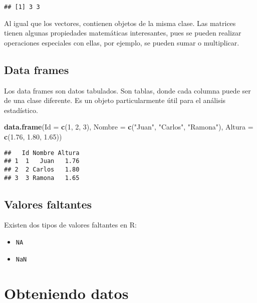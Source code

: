 \documentclass[spanish,]{book}
\newenvironment{Shaded}{\begin{snugshade}}{\end{snugshade}}
\newcommand{\KeywordTok}[1]{\textcolor[rgb]{0.13,0.29,0.53}{\textbf{#1}}}
\newcommand{\DataTypeTok}[1]{\textcolor[rgb]{0.13,0.29,0.53}{#1}}
\newcommand{\DecValTok}[1]{\textcolor[rgb]{0.00,0.00,0.81}{#1}}
\newcommand{\FloatTok}[1]{\textcolor[rgb]{0.00,0.00,0.81}{#1}}
\newcommand{\StringTok}[1]{\textcolor[rgb]{0.31,0.60,0.02}{#1}}
\newcommand{\NormalTok}[1]{#1}
\providecommand{\tightlist}{%
  \setlength{\itemsep}{0pt}\setlength{\parskip}{0pt}}
\begin{document}
\begin{verbatim}
## [1] 3 3
\end{verbatim}

Al igual que los vectores, contienen objetos de la misma clase. Las
matrices tienen algunas propiedades matemáticas interesantes, pues se
pueden realizar operaciones especiales con ellas, por ejemplo, se pueden
sumar o multiplicar.

\section{Data frames}\label{data-frames}

Los data frames son datos tabulados. Son tablas, donde cada columna
puede ser de una clase diferente. Es un objeto particularmente útil para
el análisis estadístico.

\begin{Shaded}
\begin{Highlighting}[]
\KeywordTok{data.frame}\NormalTok{(}\DataTypeTok{Id =} \KeywordTok{c}\NormalTok{(}\DecValTok{1}\NormalTok{, }\DecValTok{2}\NormalTok{, }\DecValTok{3}\NormalTok{),}
           \DataTypeTok{Nombre =} \KeywordTok{c}\NormalTok{(}\StringTok{"Juan"}\NormalTok{, }\StringTok{"Carlos"}\NormalTok{, }\StringTok{"Ramona"}\NormalTok{),}
           \DataTypeTok{Altura =} \KeywordTok{c}\NormalTok{(}\FloatTok{1.76}\NormalTok{, }\FloatTok{1.80}\NormalTok{, }\FloatTok{1.65}\NormalTok{))}
\end{Highlighting}
\end{Shaded}

\begin{verbatim}
##   Id Nombre Altura
## 1  1   Juan   1.76
## 2  2 Carlos   1.80
## 3  3 Ramona   1.65
\end{verbatim}

\section{Valores faltantes}\label{valores-faltantes}

Existen dos tipos de valores faltantes en R:

\begin{itemize}
\tightlist
\item
  \texttt{NA}
\item
  \texttt{NaN}
\end{itemize}

\chapter{Obteniendo datos}\label{obteniendo-datos}
\end{document}
